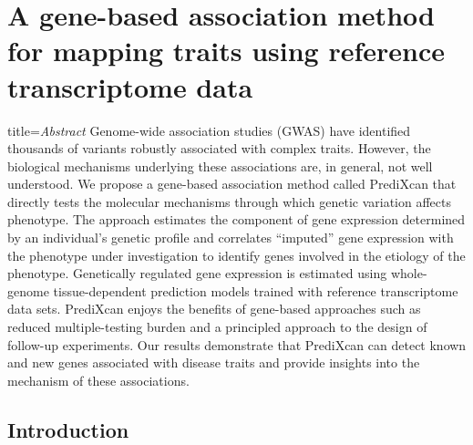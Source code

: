 \documentclass[../main.tex]{subfiles}
\begin{document}
\chapter{A gene-based association method for mapping traits using 
reference transcriptome data}

\begin{external_abstract}{title=\textit{Abstract}}
Genome-wide association studies (GWAS) have identified thousands of 
variants robustly associated with complex traits. However, the 
biological mechanisms underlying these associations are, in general, not 
well understood. We propose a gene-based association method called 
PrediXcan that directly tests the molecular mechanisms through which 
genetic variation affects phenotype. The approach estimates the 
component of gene expression determined by an individual's genetic 
profile and correlates \enquote{imputed} gene expression with the 
phenotype under investigation to identify genes involved in the etiology 
of the phenotype. Genetically regulated gene expression is estimated 
using whole-genome tissue-dependent prediction models trained with 
reference transcriptome data sets. PrediXcan enjoys the benefits of 
gene-based approaches such as reduced multiple-testing burden and a 
principled approach to the design of follow-up experiments. Our results 
demonstrate that PrediXcan can detect known and new genes associated 
with disease traits and provide insights into the mechanism of these 
associations.
\end{external_abstract}

\section{Introduction}
\end{document}
